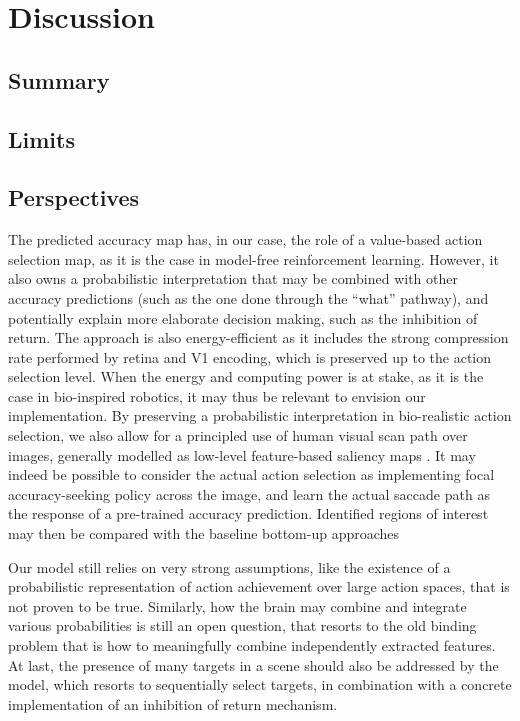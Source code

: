 \section{Discussion}
\label{sec:discussion}
\CNS
\subsection{Summary}

\subsection{Limits}

\subsection{Perspectives}
\else

The predicted accuracy map has, in our case, the role of a value-based action selection map, as it is the case in model-free reinforcement learning. However, it also owns a probabilistic interpretation that may be combined with other accuracy predictions (such as the one done through the ``what'' pathway), and potentially explain more elaborate decision making, such as the inhibition of return. The approach is also energy-efficient as it includes the strong compression rate performed by retina and V1 encoding, which is preserved up to the action selection level. When the energy and computing power is at stake, as it is the case in bio-inspired robotics, it may thus be relevant to envision our implementation. By preserving a probabilistic interpretation in bio-realistic action selection, we also allow for a principled use of human visual scan path over images, generally modelled as low-level feature-based saliency maps \cite{Itti01}. It may indeed be possible to consider the actual action selection as implementing focal accuracy-seeking policy across the image, and learn the actual saccade path as the response of a pre-trained accuracy prediction. Identified regions of interest may then be compared with the baseline bottom-up approaches

Our model still relies on very strong assumptions, like the existence of a probabilistic representation of action achievement over large action spaces, that is not proven to be true. Similarly, how the brain may combine and integrate various probabilities is still an open question, that resorts to the old binding problem that is how to meaningfully combine independently extracted features. At last, the presence of many targets in a scene should also be addressed by the model, which resorts to sequentially select targets, in combination with a concrete implementation of an inhibition of return mechanism.   

\fi

